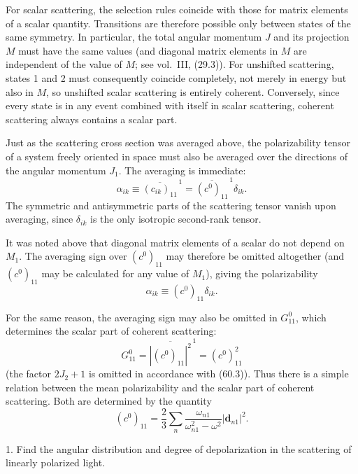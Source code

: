 For scalar scattering, the selection rules coincide with those for matrix elements of a scalar quantity. Transitions are therefore possible only between states of the same symmetry. In particular, the total angular momentum $J$ and its projection $M$ must have the same values (and diagonal matrix elements in $M$ are independent of the value of $M$; see vol.~III, (29.3)). For unshifted scattering, states 1 and 2 must consequently coincide completely, not merely in energy but also in $M$, so unshifted scalar scattering is entirely coherent. Conversely, since every state is in any event combined with itself in scalar scattering, coherent scattering always contains a scalar part.

Just as the scattering cross section was averaged above, the polarizability tensor of a system freely oriented in space must also be averaged over the directions of the angular momentum $J_1$. The averaging is immediate:
\[
\alpha_{ik}\equiv\overline{(c_{ik})_{11}}^{\,1}=\overline{(c^0)_{11}}^{\,1}\delta_{ik}.
\]
The symmetric and antisymmetric parts of the scattering tensor vanish upon averaging, since $\delta_{ik}$ is the only isotropic second-rank tensor.

It was noted above that diagonal matrix elements of a scalar do not depend on $M_1$. The averaging sign over $(c^0)_{11}$ may therefore be omitted altogether (and $(c^0)_{11}$ may be calculated for any value of $M_1$), giving the polarizability
\begin{equation}
\alpha_{ik}\equiv(c^0)_{11}\delta_{ik}.
\tag{60.9}
\end{equation}

For the same reason, the averaging sign may also be omitted in $G_{11}^0$, which determines the scalar part of coherent scattering:
\begin{equation}
G_{11}^0=\overline{|(c^0)_{11}|^2}^{\,1}=(c^0)_{11}^2
\tag{60.10}
\end{equation}
(the factor $2J_2+1$ is omitted in accordance with (60.3)). Thus there is a simple relation between the mean polarizability and the scalar part of coherent scattering. Both are determined by the quantity
\begin{equation}
(c^0)_{11}=\frac23\sum_n\frac{\omega_{n1}}{\omega_{n1}^2-\omega^2}|\mathbf d_{n1}|^2.
\tag{60.11}
\end{equation}

\ProblemHeading

1. Find the angular distribution and degree of depolarization in the scattering of linearly polarized light.

